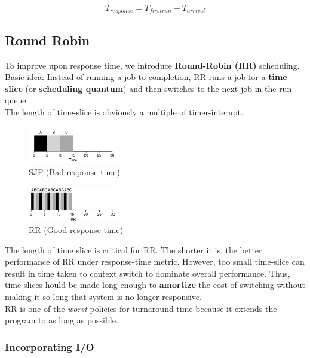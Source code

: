 $$
T_{response} = T_{firstrun} - T_{arrival}
$$

\subsection{Round Robin}

To improve upon response time, we introduce \textbf{Round-Robin (RR)}
scheduling. Basic idea: Instead of running a job to completion, RR runs a job
for a \textbf{time slice} (or \textbf{scheduling quantum}) and then switches
to the next job in the run queue.\\

The length of time-slice is obviously a multiple of timer-interupt.\\

\begin{figure}[h!]
    \begin{center}
        \includegraphics[width=4cm]{img/76}
        \caption{SJF (Bad response time)}
    \end{center}
\end{figure}

\begin{figure}[h!]
    \begin{center}
        \includegraphics[width=4cm]{img/77}
        \caption{RR (Good response time)}
    \end{center}
\end{figure}

The length of time slice is critical for RR. The shorter it is, the better
performance of RR under response-time metric. However, too small time-slice can
result in time taken to context switch to dominate overall performance. Thus,
time slices hould be made long enough to  \textbf{amortize} the cost of
switching without making it so long that system is no longer responsive.\\

RR is one of the \textit{worst} policies for turnaround time because it extends
the program to as long as possible.

\subsubsection{Incorporating I/O}

